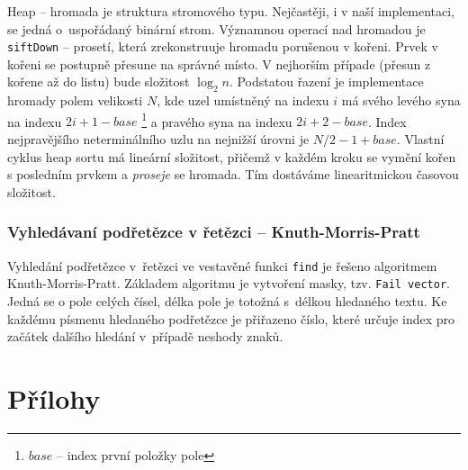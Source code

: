 \documentclass[a4paper, 12pt]{article}
\begin{document}
Heap -- hromada je struktura stromového typu. Nejčastěji, i v naší 
implementaci, se jedná o~uspořádaný binární strom. Významnou operací nad 
hromadou je \texttt{siftDown} -- prosetí, která zrekonstruuje hromadu 
porušenou v kořeni. Prvek v kořeni se postupně přesune na správné místo. V 
nejhorším případe (přesun z kořene až do listu) bude složitost $\log_2 n$. 
Podstatou řazení je implementace hromady polem velikosti $N$, kde uzel 
umístněný na indexu $i$ má svého levého syna na indexu $2i+1-base$ 
\footnote{$base$ -- index první položky pole} a pravého syna na indexu 
$2i+2-base$. Index nejpravějšího neterminálního uzlu na nejnižší úrovni je
$N/2-1+base$. Vlastní cyklus heap sortu má lineární složitost, přičemž v každém 
kroku se vymění kořen s posledním prvkem a \textit{proseje} se hromada. Tím 
dostáváme linearitmickou časovou složitost.

\subsubsection{Vyhledávaní podřetězce v řetězci -- Knuth-Morris-Pratt}
Vyhledání podřetězce v~řetězci ve vestavěné funkci \texttt{find} je řešeno
algoritmem Knuth-Morris-Pratt. Základem algoritmu je vytvoření masky, tzv.
\texttt{Fail vector}. Jedná se o pole celých čísel, délka pole je totožná
s~délkou hledaného textu. Ke každému písmenu hledaného podřetězce je přiřazeno
číslo, které určuje index pro začátek dalšího hledání v~případě neshody znaků.

\newpage
\section{Přílohy} \label{prilohy}

\renewcommand\thesubsection{\thesection.\Alph{subsection}}

\end{document}
